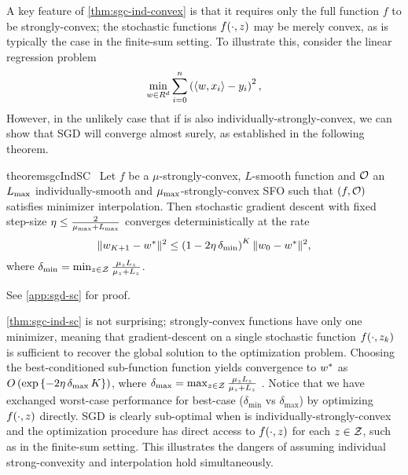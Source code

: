 A key feature of \autoref{thm:sgc-ind-convex} is that it requires only the full function \( f \) to be strongly-convex; the stochastic functions \( f(\cdot, \z) \) may be merely convex, as is typically the case in the finite-sum setting.
To illustrate this, consider the linear regression problem
\[ \min_{\w \in R^d} \sum_{i=0}^n \rbr{\abr{\w, x_i} - y_i}^2, \]
However, in the unlikely case that if \oracle{} is also individually-strongly-convex, we can show that \ac{SGD} will converge almost surely, as established in the following theorem.

\begin{restatable}{theorem}{sgcIndSC}~\label{thm:sgc-ind-sc}
    Let \( f \) be a \( \mu \)-strongly-convex, \( L \)-smooth function and \( \oracle{} \) an \( \Lmax \) individually-smooth and \( \mumax \)-strongly-convex \ac{SFO} such that \( \rbr{f, \oracle{}} \) satisfies minimizer interpolation. 
    Then stochastic gradient descent with fixed step-size \( \eta \leq \frac{2}{\mumax + \Lmax} \) converges deterministically at the rate 
    \[ \norm{\w_{K+1} - \wopt}^2 \leq \rbr{1 - 2 \eta \, \delta_{\text{min}} }^K \norm{\w_0 - \wopt}^2, \] 
    where \( \delta_{\text{min}} = \min_{\z \in \calZ} \frac{\mu_\z L_\z}{\mu_\z + L_\z} \).
\end{restatable}%
\noindent See \autoref{app:sgd-sc} for proof.\hfill \break

\autoref{thm:sgc-ind-sc} is not surprising; strongly-convex functions have only one minimizer, meaning that gradient-descent on a single stochastic function \( f(\cdot, \zk) \) is sufficient to recover the global solution to the optimization problem.
Choosing the best-conditioned sub-function function yields convergence to \( \wopt \) as \( O\rbr{\exp\cbr{ - 2 \eta \, \delta_{\text{max}} \, K}} \), where \( \delta_{\text{max}} = \max_{\z \in \calZ} \frac{\mu_z L_\z}{\mu_z + L_\z} \) \citep{bubeck2015convex}.
Notice that we have exchanged worst-case performance for best-case (\( \delta_{\text{min}} \) vs \( \delta_{\text{max}} \)) by optimizing \( f(\cdot, \z) \) directly.
\ac{SGD} is clearly sub-optimal when \oracle{} is individually-strongly-convex and the optimization procedure has direct access to \( f(\cdot, \z ) \) for each \( \z \in \calZ \), such as in the finite-sum setting. 
This illustrates the dangers of assuming individual strong-convexity and interpolation hold simultaneously.

